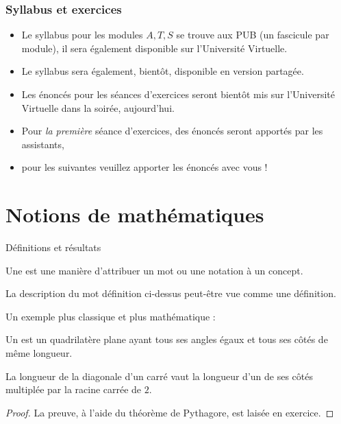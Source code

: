 \begin{frame}
  \frametitle{Syllabus et exercices}
  \begin{itemize}[<+->]
  \item Le syllabus pour les modules \(A, T, S\) se trouve aux PUB (un fascicule par module), il sera également disponible sur l'Université Virtuelle.
  \item Le syllabus sera également, bientôt, disponible en version partagée.
  \item Les énoncés pour les séances d'exercices seront bientôt mis sur l'Université Virtuelle dans la soirée, aujourd'hui.
  \item Pour \emph{la première} séance d'exercices, des énoncés seront apportés par les assistants,
  \item pour les suivantes veuillez apporter les énoncés avec vous !
  \end{itemize}
\end{frame}

\section{Notions de mathématiques}
\begin{frame}{Définitions et résultats}
  \begin{definition}
    Une  est une manière d'attribuer un mot ou une notation à un concept.
  \end{definition}

  \begin{example}
    La description du mot \og définition\fg{} ci-dessus peut-être vue comme une définition.
  \end{example}\pause

  \begin{example}Un exemple plus classique et plus \og mathématique\fg{} :
    \begin{definition}
      Un  est un quadrilatère plane ayant tous ses angles égaux et tous ses côtés de même longueur.
    \end{definition}
  \end{example}\pause
\end{frame}
\begin{frame}%
  \begin{theorem}
    La longueur de la diagonale d'un carré vaut la longueur d'un de ses côtés multiplée par la racine carrée de \(2\).
  \end{theorem}
  \begin{proof}\pause
    La preuve, à l'aide du théorème de Pythagore, est laisée en exercice.
  \end{proof}
\end{frame}

